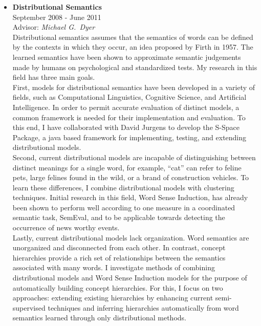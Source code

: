 \documentclass[10pt]{article}
\newenvironment{outerlist}[1][\enskip\textbullet]%
        {\begin{itemize}[#1,leftmargin=*]}{\end{itemize}%
         \vspace{-.6\baselineskip}}
\begin{document}
\begin{outerlist}

\item[] \textbf{Distributional Semantics} \\
        September 2008 - June 2011 \\
        Advisor: \textit{Michael G.~Dyer} \\

        Distributional semantics assumes that the semantics of words can be
        defined by the contexts in which they occur, an idea proposed by Firth
        in 1957. The learned semantics have been shown to approximate semantic
        judgements made by humans on psychological and standardized tests. My
        research in this field has three main goals. \\

        First, models for distributional semantics have been developed in a
        variety of fields, such as Computational Linguistics, Cognitive Science,
        and Artificial Intelligence. In order to permit accurate evaluation of
        distinct models, a common framework is needed for their implementation
        and evaluation. To this end, I have collaborated with David Jurgens to
        develop the S-Space Package, a java based framework for implementing,
        testing, and extending distributional models. \\

        Second, current distributional models are incapable of distinguishing
        between distinct meanings for a single word, for example, “cat” can
        refer to feline pets, large felines found in the wild, or a brand of
        construction vehicles. To learn these differences, I combine
        distributional models with clustering techniques. Initial research in
        this field, Word Sense Induction, has already been shown
        to perform well according to one measure in a coordinated semantic task,
        SemEval, and to be applicable towards detecting the occurrence of news
        worthy events. \\

        Lastly, current distributional models lack organization. Word semantics
        are unorganized and disconnected from each other. In contrast, concept
        hierarchies provide a rich set of relationships between the semantics
        associated with many words. I investigate methods of combining
        distributional models and Word Sense Induction models for the purpose of
        automatically building concept hierarchies. For this, I focus on two
        approaches: extending existing hierarchies by enhancing current
        semi-supervised techniques and inferring hierarchies automatically
        from word semantics learned through only distributional methods.

\end{outerlist}
\end{document}
